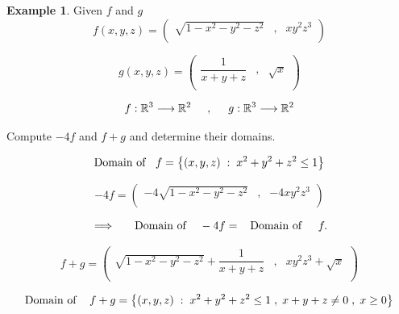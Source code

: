 \documentclass[11pt,a4paper]{article}
\theoremstyle{definition}
\newtheorem{exa}[thm]{Example}
\begin{document}
\begin{exa}


Given $f$ and $g$
$$f(x,y,z) =\begin{pmatrix}
\sqrt{1 - x^2 - y^2 -z^2} & , & xy^2z^3\\
\end{pmatrix}
$$

$$g(x,y,z) = \begin{pmatrix}
\dfrac{1}{x + y + z} & , & \sqrt{x}\\
\end{pmatrix}
$$

$$f: \mathbb{R}^3 \longrightarrow \mathbb{R}^2\hspace{0.5cm}, \hspace{0.5cm} g: \mathbb{R}^3 \longrightarrow \mathbb{R}^2$$

Compute $-4f$ and $f+g$ and determine their domains.


$$\text{Domain of }\hspace{0.2cm} f = \big\{(x,y,z)\hspace{0.1cm}:\hspace{0.1cm} x^2 + y^2 + z^2 \leq 1\big\}$$

$$-4f =\begin{pmatrix}
-4\sqrt{1 - x^2 - y^2 -z^2} & , & -4 xy^2z^3\\
\end{pmatrix}
$$

$$\implies \hspace{0.5cm} \text{Domain of }\hspace{0.3cm} -4f = \hspace{0.3cm} \text{Domain of }\hspace{0.4cm} f.$$


$$f +g =\begin{pmatrix}
\sqrt{1 - x^2 - y^2 -z^2} + \dfrac{1}{x + y + z} & , & xy^2z^3 + \sqrt{x}\\
\end{pmatrix}
$$

$$\text{Domain of } \hspace{0.3cm} f+ g = \big\{ (x,y,z)\hspace{0.1cm} : \hspace{0.1cm} x^2 + y^2 + z^2 \leq 1 \hspace{0.1cm}, \hspace{0.1cm} x+y+z\neq 0\hspace{0.1cm},\hspace{0.1cm} x\geq 0\big\}$$
\end{exa}
\end{document}

